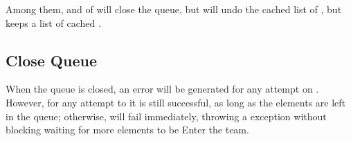 \begin{content}
Among them,  and  of  will close the queue, but  will undo the cached list of , but  keeps a list of cached .


\subsection{Close Queue}
When the queue is closed, an error will be generated for any attempt on . However, for any attempt to  it is still successful, as long as the elements are left in the queue; otherwise,  will fail immediately, throwing a  exception without blocking waiting for more elements to be Enter the team.

\end{content}
